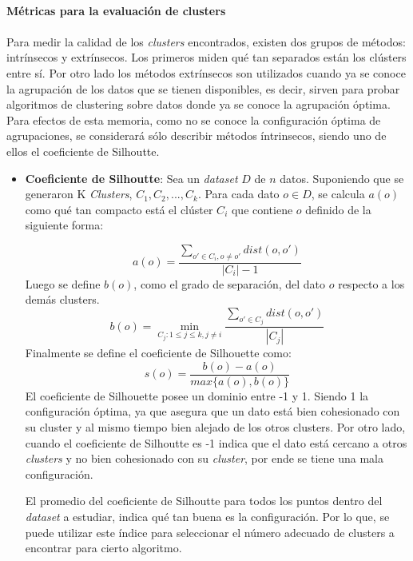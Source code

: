 \paragraph{Métricas para la evaluación de clusters}
\paragraph*{}
    Para medir la calidad de los \textit{clusters} encontrados, existen dos grupos de métodos: intrínsecos y extrínsecos. Los primeros miden qué tan separados están los clústers entre sí. Por otro lado los métodos extrínsecos son utilizados cuando ya se conoce la agrupación de los datos que se tienen disponibles, es decir, sirven para probar algoritmos de clustering sobre datos donde ya se conoce la agrupación óptima. Para efectos de esta memoria, como no se conoce la configuración óptima de agrupaciones, se considerará sólo describir métodos íntrinsecos, siendo uno de ellos el coeficiente de Silhoutte.
    
    \begin{itemize} 
    \item \textbf{Coeficiente de Silhoutte}:
    Sea un \textit{dataset} $D$ de $n$ datos. Suponiendo que se generaron K \textit{Clusters}, $C_1,C_2,...,C_k$. Para cada dato $o \in D$, se calcula $a(o)$ como qué tan compacto está el clúster $C_i$ que contiene $o$  definido de la siguiente forma:
    
    \begin{equation*}
        a(o) = \frac{\sum_{o' \in C_i, o \neq o'}dist(o,o')}{|C_i| - 1 }
    \end{equation*}
    Luego se define $b(o)$, como el grado de separación, del dato $o$ respecto a los demás clusters.
    \begin{equation*}
        b(o) = \min_{C_j:1\leq j \leq k, j \neq i} \frac{\sum_{o' \in C_j}dist(o,o')}{|C_j|}
    \end{equation*}
    Finalmente se define el coeficiente de Silhouette \cite{rousseeuw1987silhouettes} como:
    \begin{equation*}
        s(o) = \frac{b(o) - a(o)}{max\{a(o),b(o)\}}
    \end{equation*}
    El coeficiente de Silhouette posee un dominio entre -1 y 1. Siendo 1 la configuración óptima, ya que asegura que un dato está bien cohesionado con su cluster y al mismo tiempo bien alejado de los otros clusters. Por otro lado, cuando el coeficiente de Silhoutte es -1 indica que el dato está cercano a otros \textit{clusters} y no bien cohesionado con su \textit{cluster}, por ende se tiene una mala configuración.
    
    El promedio del coeficiente de Silhoutte para todos los puntos dentro del \textit{dataset} a estudiar, indica qué tan buena es la configuración. Por lo que, se puede utilizar este índice para seleccionar el número adecuado de clusters a encontrar para cierto algoritmo. \end{itemize}

